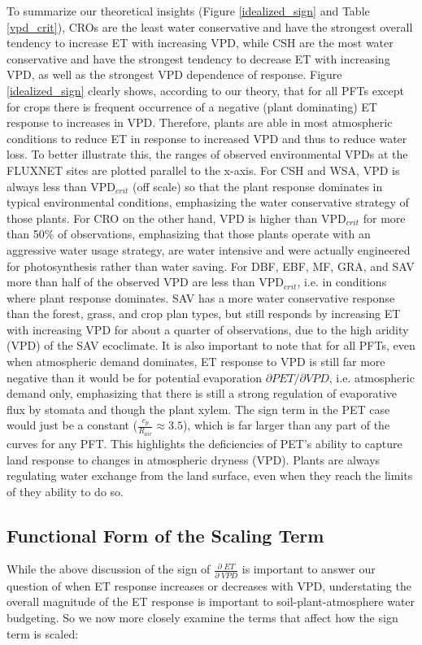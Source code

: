 To summarize our theoretical insights (Figure \ref{idealized_sign} and
Table \ref{vpd_crit}), CROs are the least water conservative and have
the strongest overall tendency to increase ET with increasing VPD,
while CSH are the most water conservative and have the strongest
tendency to decrease ET with increasing VPD, as well as the strongest
VPD dependence of response. Figure \ref{idealized_sign} clearly shows,
according to our theory, that for all PFTs except for crops there is
frequent occurrence of a negative (plant dominating) ET response to
increases in VPD. Therefore, plants are able in most atmospheric
conditions to reduce ET in response to increased VPD and thus to
reduce water loss. To better illustrate this, the ranges of observed
environmental VPDs at the FLUXNET sites are plotted parallel to the
x-axis. For CSH and WSA, VPD is always less than VPD$_{crit}$ (off scale) so
that the plant response dominates in typical environmental conditions,
emphasizing the water conservative strategy of those plants. For CRO
on the other hand, VPD is higher than VPD$_{crit}$ for more than 50\%
of observations, emphasizing that those plants operate with an
aggressive water usage strategy, are water intensive and were actually
engineered for photosynthesis rather than water saving. For DBF, EBF,
MF, GRA, and SAV more than half of the observed VPD are less than
VPD$_{crit}$, i.e. in conditions where plant response dominates. SAV
has a more water conservative response than the forest, grass, and
crop plan types, but still responds by increasing ET with increasing
VPD for about a quarter of observations, due to the high aridity (VPD)
of the SAV ecoclimate. It is also important to note that for all PFTs,
even when atmospheric demand dominates, ET response to VPD is still
far more negative than it would be for potential evaporation
$\partial PET/\partial VPD$, i.e. atmospheric demand only, emphasizing
that there is still a strong regulation of evaporative flux by stomata
and though the plant xylem. The sign term in the PET case would just
be a constant ($\frac{c_p}{R_{air}} \approx 3.5$), which is far larger
than any part of the curves for any PFT. This highlights the
deficiencies of PET's ability to capture land response to changes in
atmospheric dryness (VPD). Plants are always regulating water exchange
from the land surface, even when they reach the limits of they ability
to do so.

\subsection{Functional Form of the Scaling Term}
\label{scale_term}
While the above discussion of the sign of
$\frac{\partial \; ET}{\partial \; VPD}$ is important to answer our
question of when ET response increases or decreases with VPD,
understating the overall magnitude of the ET response is important to
soil-plant-atmosphere water budgeting. So we now more closely examine
the terms that affect how the sign term is scaled:

